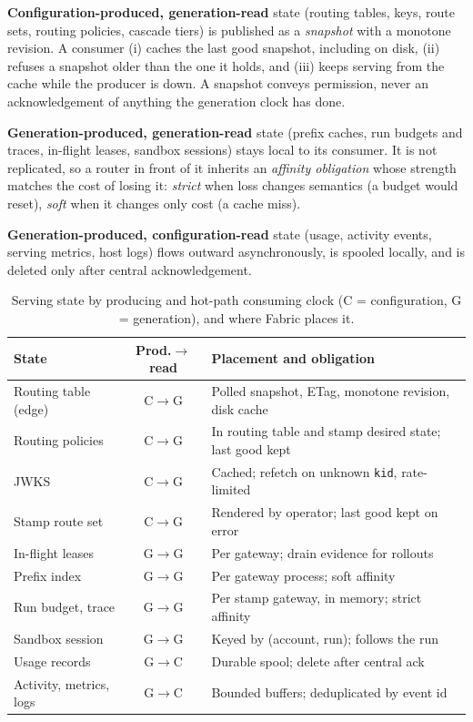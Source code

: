 \documentclass[conference,letterpaper]{IEEEtran}
\newcommand{\sys}{Fabric}
\newcommand{\code}[1]{\texttt{\small #1}}
\begin{document}
\textbf{Configuration-produced, generation-read} state (routing tables, keys, route sets,
routing policies, cascade tiers) is published as a \emph{snapshot} with a monotone revision.
A consumer (i) caches the last good snapshot, including on disk, (ii) refuses a snapshot
older than the one it holds, and (iii) keeps serving from the cache while the producer is
down. A snapshot conveys permission, never an acknowledgement of anything the generation
clock has done.

\textbf{Generation-produced, generation-read} state (prefix caches, run budgets and traces,
in-flight leases, sandbox sessions) stays local to its consumer. It is not replicated, so a
router in front of it inherits an \emph{affinity obligation} whose strength matches the cost
of losing it: \emph{strict} when loss changes semantics (a budget would reset), \emph{soft}
when it changes only cost (a cache miss).

\textbf{Generation-produced, configuration-read} state (usage, activity events, serving
metrics, host logs) flows outward asynchronously, is spooled locally, and is deleted only
after central acknowledgement.

\begin{table}[t]
\centering
\caption{Serving state by producing and hot-path consuming clock (C = configuration,
G = generation), and where \sys{} places it.}
\label{tab:state}
\footnotesize
\begin{tabularx}{\columnwidth}{@{}l c X@{}}
\toprule
State & Prod.$\to$read & Placement and obligation \\
\midrule
Routing table (edge) & C$\to$G & Polled snapshot, ETag, monotone revision, disk cache \\
Routing policies & C$\to$G & In routing table and stamp desired state; last good kept \\
JWKS & C$\to$G & Cached; refetch on unknown \code{kid}, rate-limited \\
Stamp route set & C$\to$G & Rendered by operator; last good kept on error \\
In-flight leases & G$\to$G & Per gateway; drain evidence for rollouts \\
Prefix index & G$\to$G & Per gateway process; soft affinity \\
Run budget, trace & G$\to$G & Per stamp gateway, in memory; strict affinity \\
Sandbox session & G$\to$G & Keyed by (account, run); follows the run \\
Usage records & G$\to$C & Durable spool; delete after central ack \\
Activity, metrics, logs & G$\to$C & Bounded buffers; deduplicated by event id \\
\bottomrule
\end{tabularx}
\end{table}
\end{document}
